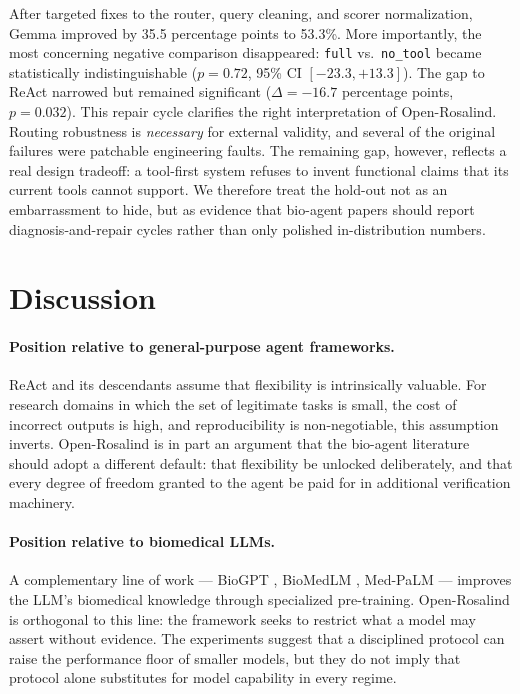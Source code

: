 \documentclass[11pt,letterpaper]{article}
\begin{document}
After targeted fixes to the router, query cleaning, and scorer normalization, Gemma improved by 35.5 percentage points to 53.3\%. More importantly, the most concerning negative comparison disappeared: \texttt{full} vs.\ \texttt{no\_tool} became statistically indistinguishable ($p=0.72$, 95\% CI $[-23.3, +13.3]$). The gap to ReAct narrowed but remained significant ($\Delta=-16.7$ percentage points, $p=0.032$). This repair cycle clarifies the right interpretation of Open-Rosalind. Routing robustness is \emph{necessary} for external validity, and several of the original failures were patchable engineering faults. The remaining gap, however, reflects a real design tradeoff: a tool-first system refuses to invent functional claims that its current tools cannot support. We therefore treat the hold-out not as an embarrassment to hide, but as evidence that bio-agent papers should report diagnosis-and-repair cycles rather than only polished in-distribution numbers.

\section{Discussion}
\label{sec:discussion}

\paragraph{Position relative to general-purpose agent frameworks.}
ReAct \cite{yao2023react} and its descendants assume that flexibility is intrinsically valuable. For research domains in which the set of legitimate tasks is small, the cost of incorrect outputs is high, and reproducibility is non-negotiable, this assumption inverts. Open-Rosalind is in part an argument that the bio-agent literature should adopt a different default: that flexibility be unlocked deliberately, and that every degree of freedom granted to the agent be paid for in additional verification machinery.

\paragraph{Position relative to biomedical LLMs.}
A complementary line of work --- BioGPT \cite{luo2022biogpt}, BioMedLM \cite{stanford2023biomedlm}, Med-PaLM \cite{singhal2023palm2} --- improves the LLM's biomedical knowledge through specialized pre-training. Open-Rosalind is orthogonal to this line: the framework seeks to restrict what a model may assert without evidence. The experiments suggest that a disciplined protocol can raise the performance floor of smaller models, but they do not imply that protocol alone substitutes for model capability in every regime.
\end{document}
